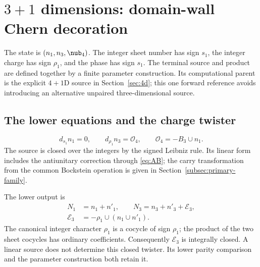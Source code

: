 \section{\texorpdfstring{$3+1$}{3+1} dimensions: domain-wall Chern decoration}\label{sec:3d}
The state is $(n_1,n_3,\nub_4)$. The integer sheet number has sign $s_1$, the integer charge has sign $\rho_1$, and the phase has sign $s_1$. The terminal source and product are defined together by a finite parameter construction. Its computational parent is the explicit $4+1$D source in Section~\ref{sec:4d}; this one forward reference avoids introducing an alternative unpaired three-dimensional source.

\subsection{The lower equations and the charge twister}
\begin{equation}\label{eq:3d-lower}
 \boxed{d_{s_1}n_1=0,\qquad d_{\rho_1}n_3=\mathcal O_4,
 \qquad\mathcal O_4=-B_3\cup n_1.}
\end{equation}
The source is closed over the integers by the signed Leibniz rule. Its linear form includes the antiunitary correction through \eqref{eq:AB}; the carry transformation from the common Bockstein operation is given in Section~\ref{subsec:primary-family}.

The lower output is
\begin{equation}\label{eq:3d-integer-product}
 \boxed{\begin{aligned}
 N_1&=n_1+n'_1,\qquad
 N_3=n_3+n'_3+\mathcal E_3,\\
 \mathcal E_3&=-\rho_1\cup(n_1\cup n'_1).
 \end{aligned}}
\end{equation}
The canonical integer character $\rho_1$ is a cocycle of sign $\rho_1$; the product of the two sheet cocycles has ordinary coefficients. Consequently $\mathcal E_3$ is integrally closed. A linear source does not determine this closed twister. Its lower parity comparison and the parameter construction both retain it.

